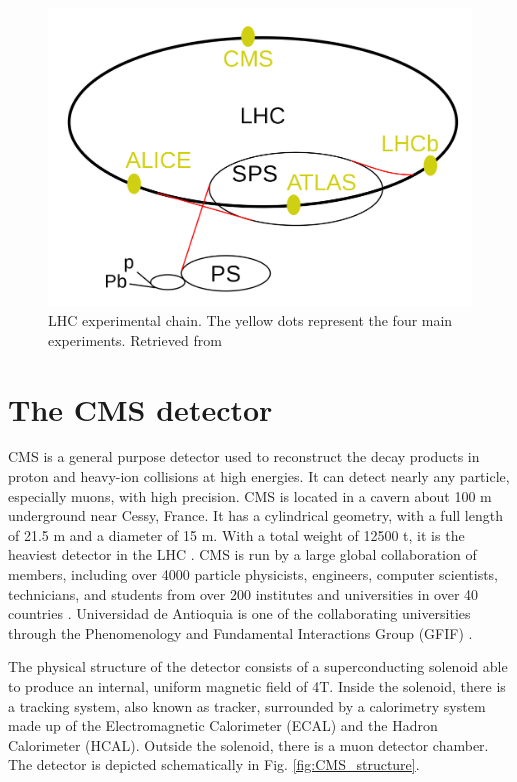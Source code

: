 \begin{figure}[htp!]
	\centering
	\includegraphics[scale=0.3]{MainContent/Figs/LHC.png}
	\caption{LHC experimental chain. The yellow dots represent the four main experiments. Retrieved from \cite{nobrega2013lhc}}
	\label{fig:LHC}
\end{figure}

\section{The CMS detector}
\label{section:cms}

CMS is a general purpose detector used to reconstruct the decay products in proton and heavy-ion collisions at high energies. It can detect nearly any particle, especially muons, with high precision. CMS is located in a cavern about 100 m underground near Cessy, France. It has a cylindrical geometry, with a full length of 21.5 m and a diameter of 15 m. With a total weight of 12500 t, it is the heaviest detector in the LHC \cite{bragagnolo2021measurement, mejia2012medida}. CMS is run by a large global collaboration of members, including over 4000 particle physicists, engineers, computer scientists, technicians, and students from over 200 institutes and universities in over 40 countries \cite{cms_collab}. Universidad de Antioquia is one of the collaborating universities through the Phenomenology and Fundamental Interactions Group (GFIF) \cite{restrepo2019udea}.

The physical structure of the detector consists of a superconducting solenoid able to produce an internal, uniform magnetic field of 4T. Inside the solenoid, there is a tracking system, also known as tracker, surrounded by a calorimetry system made up of the Electromagnetic Calorimeter (ECAL) and the Hadron Calorimeter (HCAL). Outside the solenoid, there is a muon detector chamber. The detector is depicted schematically in Fig. \ref{fig:CMS_structure}.

